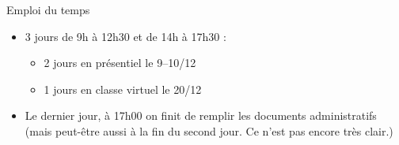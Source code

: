 \begin{frame}{Emploi du temps}
  \begin{itemize}
  \item 3 jours de 9h à 12h30 et de 14h à 17h30 :
  \begin{itemize}
    \item 2 jours en présentiel le 9--10/12
    \item 1 jours en classe virtuel le 20/12
  \end{itemize}
  \item Le dernier jour, à 17h00 on finit de remplir les documents administratifs (mais peut-être aussi à la fin du second jour. Ce n'est pas encore très clair.)
  \end{itemize}
\end{frame}
